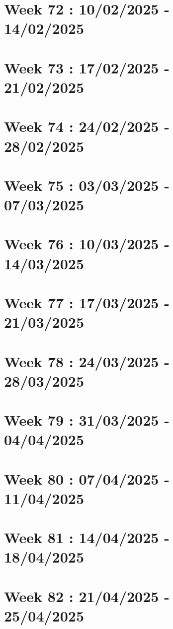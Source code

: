 \documentclass[french]{article}
\begin{document}
	\section{Week 72 : 10/02/2025 - 14/02/2025}

	\section{Week 73 : 17/02/2025 - 21/02/2025}

	\section{Week 74 : 24/02/2025 - 28/02/2025}

	\section{Week 75 : 03/03/2025 - 07/03/2025}

	\section{Week 76 : 10/03/2025 - 14/03/2025}

	\section{Week 77 : 17/03/2025 - 21/03/2025}

	\section{Week 78 : 24/03/2025 - 28/03/2025}

	\section{Week 79 : 31/03/2025 - 04/04/2025}

	\section{Week 80 : 07/04/2025 - 11/04/2025}

	\section{Week 81 : 14/04/2025 - 18/04/2025}

	\section{Week 82 : 21/04/2025 - 25/04/2025}
\end{document}
